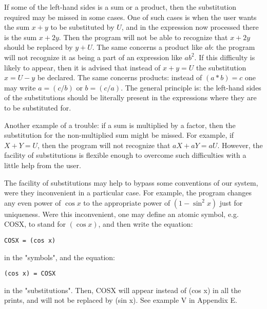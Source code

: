 If some of the left-hand sides is a sum or  a  product,
     then  the substitution required may be missed in some cases.
     One of such cases is when the user wants the sum $x + y$ to be
     substituted  by $U$, and in the expression now processed there
is the sum $x + 2y$. Then the program will not be able to  recognize  that $x +
2y$ should be replaced by $y + U$. The same concerns a product like $ab$: the
program will  not  recognize it as being a part of an expression like $ab^2$.
If this difficulty  is  likely to appear, then it is advised that instead
     of $x + y = U$ the substitution  $x = U - y$ be  declared.  The
     same concerns products: instead of $(a * b) = c$ one may write
     $a = (c / b)$ or $b = (c / a)$. The general  principle  is:  the
     left-hand  sides  of  the  substitutions should be literally
     present in the expressions where they are to be  substituted
     for.

Another example of a trouble: if a sum is multiplied by
     a  factor,  then the substitution for the non-multiplied sum
might be missed. For example, if $X + Y = U$, then  the  program  will not
recognize that $aX + aY = aU$. However, the facility of substitutions is
flexible enough to overcome  such
     difficulties with a little help from the user.

The facility of substitutions may help to  bypass  some conventions of our
system, were they inconvenient in a particular case. For example, the program
changes any even power of $\cos x$ to the appropriate power of $(1 - \sin^2 x)$
just for uniqueness. Were this inconvenient, one may define an atomic
     symbol, e.g. COSX, to stand for $(\cos x)$,  and  then  write
     the equation:

\bigskip

\begin{verbatim}
COSX = (cos x)
\end{verbatim}

\bigskip

\noindent in the "symbols", and the equation:

\bigskip

\begin{verbatim}
(cos x) = COSX
\end{verbatim}

\bigskip

\noindent in the "substitutions". Then,  COSX  will  appear  instead  of (cos
x) in  all  the  prints,  and  will not be replaced by (sin x). See example V
in Appendix E.

